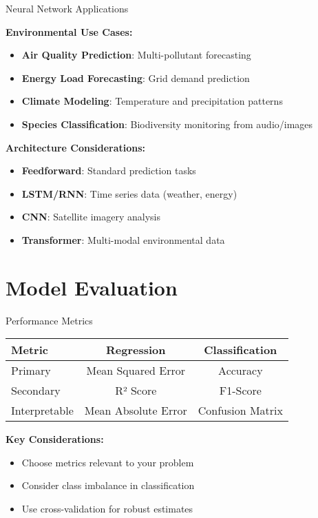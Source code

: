 \documentclass{sustainabilitylab}
\begin{document}
\begin{frame}{Neural Network Applications}

\textbf{Environmental Use Cases:}
\begin{itemize}
  \item \textbf{Air Quality Prediction}: Multi-pollutant forecasting
  \item \textbf{Energy Load Forecasting}: Grid demand prediction
  \item \textbf{Climate Modeling}: Temperature and precipitation patterns
  \item \textbf{Species Classification}: Biodiversity monitoring from audio/images
\end{itemize}

\vspace{0.5cm}

\textbf{Architecture Considerations:}
\begin{itemize}
  \item \textbf{Feedforward}: Standard prediction tasks
  \item \textbf{LSTM/RNN}: Time series data (weather, energy)
  \item \textbf{CNN}: Satellite imagery analysis
  \item \textbf{Transformer}: Multi-modal environmental data
\end{itemize}

\end{frame}


\section{Model Evaluation}

\begin{frame}{Performance Metrics}

\begin{table}[h]
\centering
\begin{tabular}{lcc}
\toprule
\textbf{Metric} & \textbf{Regression} & \textbf{Classification} \\
\midrule
Primary & Mean Squared Error & Accuracy \\
Secondary & R² Score & F1-Score \\
Interpretable & Mean Absolute Error & Confusion Matrix \\
\bottomrule
\end{tabular}
\end{table}

\textbf{Key Considerations:}
\begin{itemize}
  \item Choose metrics relevant to your problem
  \item Consider class imbalance in classification
  \item Use cross-validation for robust estimates
\end{itemize}

\end{frame}
\end{document}
